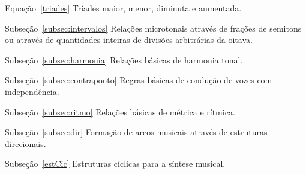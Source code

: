 \begin{listaespecial}[BIGNAMEWIDTH]
        \item[Equação~\ref{triades}] Tríades maior, menor, diminuta e aumentada.
        \item[Subseção~\ref{subsec:intervalos}] Relações microtonais através de frações de semitons ou através de quantidades inteiras de divisões arbitrárias da oitava.
        \item[Subseção~\ref{subsec:harmonia}] Relações básicas de harmonia tonal.
        \item[Subseção~\ref{subsec:contraponto}] Regras básicas de condução de vozes com independência.
        \item[Subseção~\ref{subsec:ritmo}] Relações básicas de métrica e rítmica.
        \item[Subseção~\ref{subsec:dir}] Formação de arcos musicais através de estruturas direcionais.
        \item[Subseção~\ref{estCic}] Estruturas cíclicas para a síntese musical.

	\end{listaespecial} 


